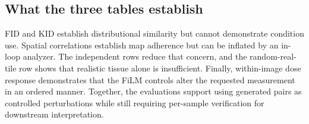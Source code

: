 \subsection{What the three tables establish}

FID and KID establish distributional similarity but cannot demonstrate condition use. Spatial correlations establish map adherence but can be inflated by an in-loop analyzer. The independent rows reduce that concern, and the random-real-tile row shows that realistic tissue alone is insufficient. Finally, within-image dose response demonstrates that the FiLM controls alter the requested measurement in an ordered manner. Together, the evaluations support using generated pairs as controlled perturbations while still requiring per-sample verification for downstream interpretation.

